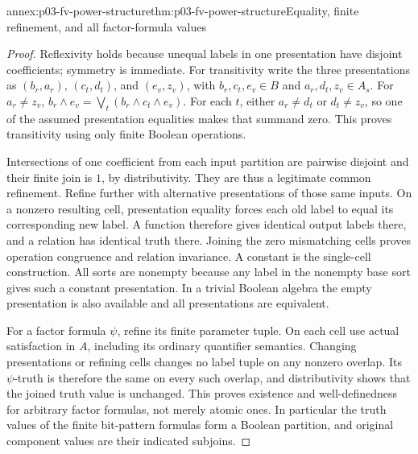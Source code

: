 \begin{annexitem}{annex:p03-fv-power-structure}{thm:p03-fv-power-structure}{Equality, finite refinement, and all factor-formula values}
\begin{proof}
Reflexivity holds because unequal labels in one presentation have disjoint
coefficients; symmetry is immediate. For transitivity write the three
presentations as \((b_r,a_r)\), \((c_t,d_t)\), and \((e_v,z_v)\), with
\(b_r,c_t,e_v\in B\) and \(a_r,d_t,z_v\in A_s\). For \(a_r\ne z_v\),
\(b_r\wedge e_v=\bigvee_t(b_r\wedge c_t\wedge e_v)\).
For each \(t\), either \(a_r\ne d_t\) or \(d_t\ne z_v\), so one
of the assumed presentation equalities makes that summand zero. This proves
transitivity using only finite Boolean operations.

Intersections of one coefficient from each input partition are pairwise
disjoint and their finite join is \(1\), by distributivity. They are thus
a legitimate common refinement. Refine further with alternative presentations
of those same inputs. On a nonzero resulting cell, presentation equality
forces each old label to equal its corresponding new label. A function
therefore gives identical output labels there, and a relation has identical
truth there. Joining the zero mismatching cells proves operation congruence
and relation invariance. A constant is the single-cell construction. All
sorts are nonempty because any label in the nonempty base sort gives such a
constant presentation. In a trivial Boolean algebra the empty presentation
is also available and all presentations are equivalent.

For a factor formula \(\psi\), refine its finite parameter tuple.
On each cell use actual satisfaction in \(A\), including its ordinary
quantifier semantics. Changing presentations or refining cells changes no
label tuple on any nonzero overlap. Its \(\psi\)-truth is therefore the
same on every such overlap, and distributivity shows that the joined truth
value is unchanged. This proves existence and well-definedness for arbitrary
factor formulas, not merely atomic ones. In particular the truth values of
the finite bit-pattern formulas form a Boolean partition, and original
component values are their indicated subjoins.
\end{proof}
\end{annexitem}

